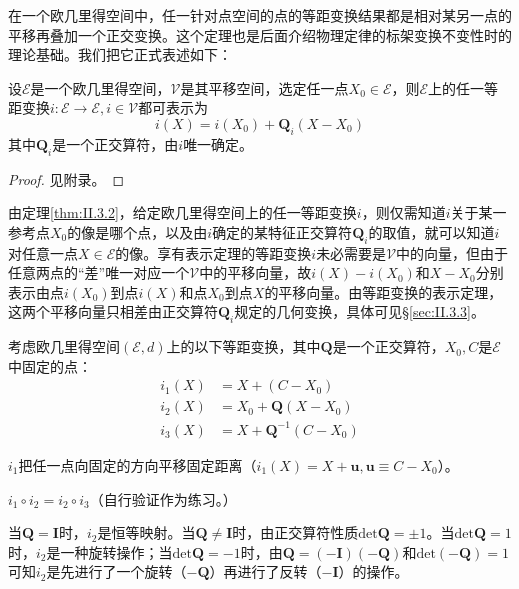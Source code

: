 \documentclass[main.tex]{subfiles}
\begin{document}
在一个欧几里得空间中，任一针对点空间的点的等距变换结果都是相对某另一点的平移再叠加一个正交变换。这个定理也是后面介绍物理定律的标架变换不变性时的理论基础。我们把它正式表述如下：

\begin{theorem}[等距变换的表示定理]\label{thm:II.3.2}
    设$\mathcal{E}$是一个欧几里得空间，$\mathcal{V}$是其平移空间，选定任一点$X_0\in\mathcal{E}$，则$\mathcal{E}$上的任一等距变换$i:\mathcal{E}\rightarrow\mathcal{E},i\in\mathcal{V}$都可表示为
    \[
        i\left(X\right)=i\left(X_0\right)+\mathbf{Q}_i\left(X-X_0\right)
    \]
    其中$\mathbf{Q}_i$是一个正交算符，由$i$唯一确定。
\end{theorem}
\begin{proof}
    见附录。
\end{proof}

由定理\ref{thm:II.3.2}，给定欧几里得空间上的任一等距变换$i$，则仅需知道$i$关于某一参考点$X_0$的像是哪个点，以及由$i$确定的某特征正交算符$\mathbf{Q}_i$的取值，就可以知道$i$对任意一点$X\in\mathcal{E}$的像。享有表示定理的等距变换$i$未必需要是$\mathcal{V}$中的向量，但由于任意两点的“差”唯一对应一个$\mathcal{V}$中的平移向量，故$i\left(X\right)-i\left(X_0\right)$和$X-X_0$分别表示由点$i\left(X_0\right)$到点$i\left(X\right)$和点$X_0$到点$X$的平移向量。由等距变换的表示定理，这两个平移向量只相差由正交算符$\mathbf{Q}_i$规定的几何变换，具体可见\S\ref{sec:II.3.3}。

\begin{example}\label{exp:II.3.4}
    考虑欧几里得空间$\left(\mathcal{E},d\right)$上的以下等距变换，其中$\mathbf{Q}$是一个正交算符，$X_0,C$是$\mathcal{E}$中固定的点：
    \begin{align*}
        i_1\left(X\right) & =X+\left(C-X_0\right)                \\
        i_2\left(X\right) & =X_0+\mathbf{Q}\left(X-X_0\right)    \\
        i_3\left(X\right) & =X+\mathbf{Q}^{-1}\left(C-X_0\right)
    \end{align*}

    $i_1$把任一点向固定的方向平移固定距离（$i_1\left(X\right)=X+\mathbf{u},\mathbf{u}\equiv C-X_0$）。

    $i_1\circ i_2=i_2\circ i_3$（自行验证作为练习。）

    当$\mathbf{Q}=\mathbf{I}$时，$i_2$是恒等映射。当$\mathbf{Q}\neq\mathbf{I}$时，由正交算符性质$\mathrm{det}\mathbf{Q}=\pm 1$。当$\mathrm{det}\mathbf{Q}=1$时，$i_2$是一种旋转操作；当$\mathrm{det}\mathbf{Q}=-1$时，由$\mathbf{Q}=\left(-\mathbf{I}\right)\left(-\mathbf{Q}\right)$和$\mathrm{det}\left(-\mathbf{Q}\right)=1$可知$i_2$是先进行了一个旋转（$-\mathbf{Q}$）再进行了反转（$-\mathbf{I}$）的操作。
\end{example}
\end{document}
